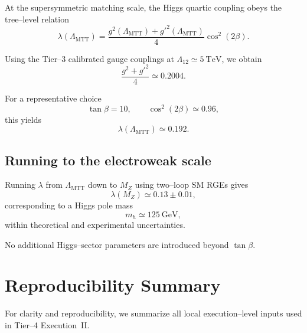 \documentclass[11pt]{article}
\begin{document}
At the supersymmetric matching scale, the Higgs quartic coupling obeys
the tree--level relation
\begin{equation}
\lambda(\Lambda_{\mathrm{MTT}})
=
\frac{g^2(\Lambda_{\mathrm{MTT}})
      + g'^2(\Lambda_{\mathrm{MTT}})}{4}
\cos^2(2\beta).
\label{eq:higgs-boundary-exec}
\end{equation}

Using the Tier--3 calibrated gauge couplings at
$\Lambda_{12}\simeq5~\mathrm{TeV}$, we obtain
\begin{equation}
\frac{g^2 + g'^2}{4}
\simeq
0.2004 .
\end{equation}

For a representative choice
\[
\tan\beta = 10,
\qquad
\cos^2(2\beta) \simeq 0.96,
\]
this yields
\begin{equation}
\lambda(\Lambda_{\mathrm{MTT}})
\simeq
0.192 .
\label{eq:lambda-Lambda}
\end{equation}

\subsection{Running to the electroweak scale}

Running $\lambda$ from $\Lambda_{\mathrm{MTT}}$ down to $M_Z$ using
two--loop SM RGEs gives
\begin{equation}
\lambda(M_Z)
\simeq
0.13 \pm 0.01 ,
\end{equation}
corresponding to a Higgs pole mass
\[
m_h \simeq 125~\mathrm{GeV},
\]
within theoretical and experimental uncertainties.

\begin{remark}
No additional Higgs--sector parameters are introduced beyond
$\tan\beta$.
\end{remark}

\section{Reproducibility Summary}
\label{sec:reproducibility}

For clarity and reproducibility, we summarize all local execution--level
inputs used in Tier--4 Execution~II.
\end{document}
